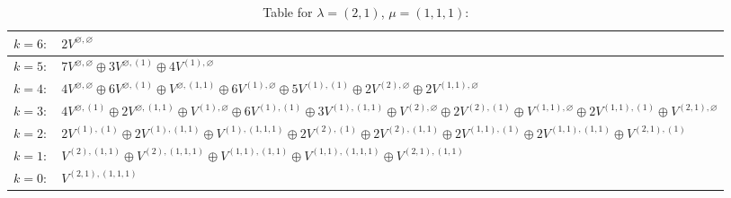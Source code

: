 \documentclass[a4paper,12pt]{article}
\begin{document}
\renewcommand{\arraystretch}{1.6} 
\begin{table}[H]
\centering
\caption{Table for $\lambda = (2, 1)$, $\mu = (1, 1, 1)$:}
\begin{tabular}{|>{\centering\arraybackslash}p{15cm}|}
\hline
 $k = 6: \quad 2 V^{\varnothing, \varnothing} $ \\ \hline
 $k = 5: \quad 7 V^{\varnothing, \varnothing} \oplus 3 V^{\varnothing, (1)} \oplus 4 V^{(1), \varnothing} $ \\ \hline
 $k = 4: \quad 4 V^{\varnothing, \varnothing} \oplus 6 V^{\varnothing, (1)} \oplus V^{\varnothing, (1, 1)} \oplus 6 V^{(1), \varnothing} \oplus 5 V^{(1), (1)} \oplus 2 V^{(2), \varnothing} \oplus 2 V^{(1, 1), \varnothing} $ \\ \hline
 $k = 3: \quad 4 V^{\varnothing, (1)} \oplus 2 V^{\varnothing, (1, 1)} \oplus V^{(1), \varnothing} \oplus 6 V^{(1), (1)} \oplus 3 V^{(1), (1, 1)} \oplus V^{(2), \varnothing} \oplus 2 V^{(2), (1)} \oplus V^{(1, 1), \varnothing} \oplus 2 V^{(1, 1), (1)} \oplus V^{(2, 1), \varnothing} $ \\ \hline
 $k = 2: \quad 2 V^{(1), (1)} \oplus 2 V^{(1), (1, 1)} \oplus V^{(1), (1, 1, 1)} \oplus 2 V^{(2), (1)} \oplus 2 V^{(2), (1, 1)} \oplus 2 V^{(1, 1), (1)} \oplus 2 V^{(1, 1), (1, 1)} \oplus V^{(2, 1), (1)} $ \\ \hline
 $k = 1: \quad V^{(2), (1, 1)} \oplus V^{(2), (1, 1, 1)} \oplus V^{(1, 1), (1, 1)} \oplus V^{(1, 1), (1, 1, 1)} \oplus V^{(2, 1), (1, 1)} $ \\ \hline
 $k = 0: \quad V^{(2, 1), (1, 1, 1)} $ \\ \hline
\end{tabular}
\end{table}
\end{document}
